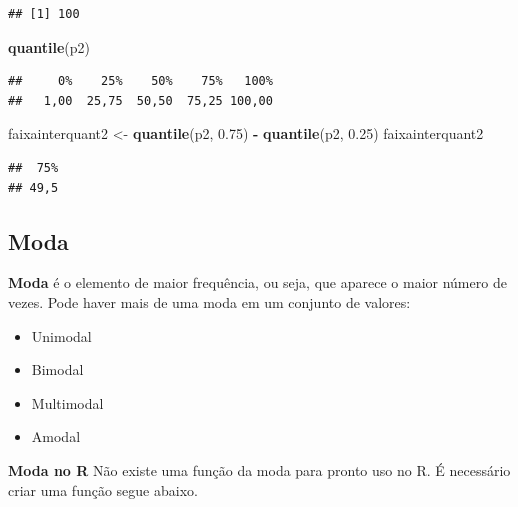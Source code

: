 \documentclass[
]{book}
\newenvironment{Shaded}{\begin{snugshade}}{\end{snugshade}}
\newcommand{\FloatTok}[1]{\textcolor[rgb]{0.00,0.00,0.81}{#1}}
\newcommand{\KeywordTok}[1]{\textcolor[rgb]{0.13,0.29,0.53}{\textbf{#1}}}
\newcommand{\NormalTok}[1]{#1}
\newcommand{\OperatorTok}[1]{\textcolor[rgb]{0.81,0.36,0.00}{\textbf{#1}}}
\newcommand{\StringTok}[1]{\textcolor[rgb]{0.31,0.60,0.02}{#1}}
\providecommand{\tightlist}{%
  \setlength{\itemsep}{0pt}\setlength{\parskip}{0pt}}
\begin{document}
\begin{verbatim}
## [1] 100
\end{verbatim}

\begin{Shaded}
\begin{Highlighting}[]
\KeywordTok{quantile}\NormalTok{(p2)}
\end{Highlighting}
\end{Shaded}

\begin{verbatim}
##     0%    25%    50%    75%   100% 
##   1,00  25,75  50,50  75,25 100,00
\end{verbatim}

\begin{Shaded}
\begin{Highlighting}[]
\NormalTok{faixainterquant2 <-}\StringTok{ }\KeywordTok{quantile}\NormalTok{(p2, }\FloatTok{0.75}\NormalTok{) }\OperatorTok{-}\StringTok{ }\KeywordTok{quantile}\NormalTok{(p2, }
    \FloatTok{0.25}\NormalTok{)}
\NormalTok{faixainterquant2}
\end{Highlighting}
\end{Shaded}

\begin{verbatim}
##  75% 
## 49,5
\end{verbatim}

\hypertarget{moda}{%
\subsection{Moda}\label{moda}}

\textbf{Moda} é o elemento de maior frequência, ou seja, que aparece o maior número de vezes. Pode haver mais de uma moda em um conjunto de valores:

\begin{itemize}
\tightlist
\item
  Unimodal
\item
  Bimodal
\item
  Multimodal
\item
  Amodal
\end{itemize}

\textbf{Moda no R}
Não existe uma função da moda para pronto uso no R. É necessário criar uma função
segue abaixo.
\end{document}

